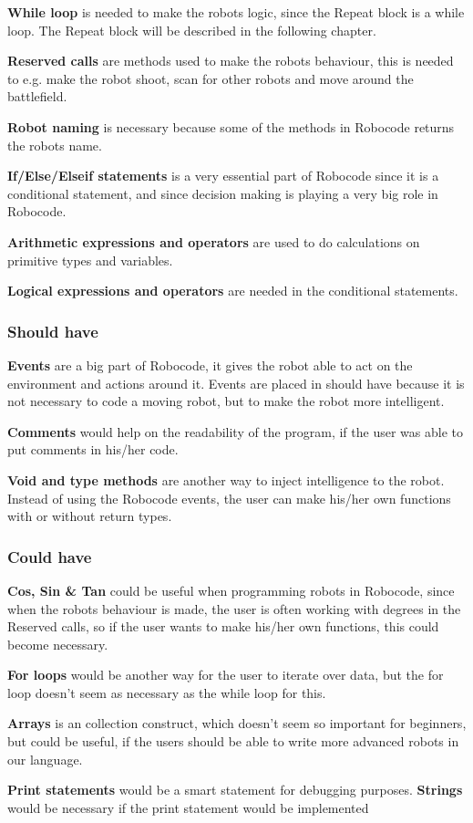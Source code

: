 \textbf{While loop} is needed to make the robots logic, since the Repeat block is a while loop. The Repeat block will be described in the following chapter.

\textbf{Reserved calls} are methods used to make the robots behaviour, this is needed to e.g. make the robot shoot, scan for other robots and move around the battlefield. 

\textbf{Robot naming} is necessary because some of the methods in Robocode returns the robots name. 

\textbf{If/Else/Elseif statements} is a very essential part of Robocode since it is a conditional statement, and since decision making is playing a very big role in Robocode.

\textbf{Arithmetic expressions and operators} are used to do calculations on primitive types and variables. 

\textbf{Logical expressions and operators} are needed in the conditional statements.

\subsubsection{Should have}
\textbf{Events} are a big part of Robocode, it gives the robot able to act on the environment and actions around it. Events are placed in should have because it is not necessary to code a moving robot, but to make the robot more intelligent.

\textbf{Comments} would help on the readability of the program, if the user was able to put comments in his/her code. 

\textbf{Void and type methods} are another way to inject intelligence to the robot. Instead of using the Robocode events, the user can make his/her own functions with or without return types. 

\subsubsection{Could have} 
\textbf{Cos, Sin \& Tan} could be useful when programming robots in Robocode, since when the robots behaviour is made, the user is often working with degrees in the Reserved calls, so if the user wants to make his/her own functions, this could become necessary.

\textbf{For loops} would be another way for the user to iterate over data, but the for loop doesn't seem as necessary as the while loop for this.
 
\textbf{Arrays} is an collection construct, which doesn't seem so important for beginners, but could be useful, if the users should be able to write more advanced robots in our language. 

\textbf{Print statements} would be a smart statement for debugging purposes.
\textbf{Strings} would be necessary if the print statement would be implemented
\textbf{}
\textbf{}
\textbf{}
\textbf{}
